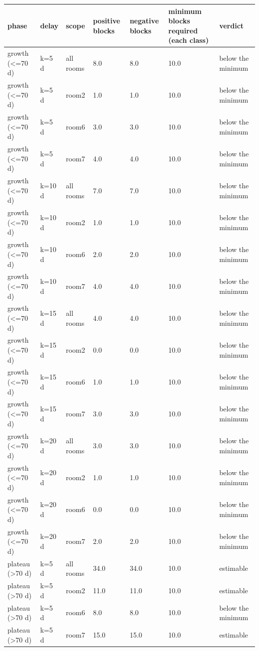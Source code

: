 \begin{tabular}{lllllll}
\hline
phase & delay & scope & positive blocks & negative blocks & minimum blocks required (each class) & verdict \\
\hline
growth (<=70 d) & k=5 d & all rooms & 8.0 & 8.0 & 10.0 & below the minimum \\
growth (<=70 d) & k=5 d & room2 & 1.0 & 1.0 & 10.0 & below the minimum \\
growth (<=70 d) & k=5 d & room6 & 3.0 & 3.0 & 10.0 & below the minimum \\
growth (<=70 d) & k=5 d & room7 & 4.0 & 4.0 & 10.0 & below the minimum \\
growth (<=70 d) & k=10 d & all rooms & 7.0 & 7.0 & 10.0 & below the minimum \\
growth (<=70 d) & k=10 d & room2 & 1.0 & 1.0 & 10.0 & below the minimum \\
growth (<=70 d) & k=10 d & room6 & 2.0 & 2.0 & 10.0 & below the minimum \\
growth (<=70 d) & k=10 d & room7 & 4.0 & 4.0 & 10.0 & below the minimum \\
growth (<=70 d) & k=15 d & all rooms & 4.0 & 4.0 & 10.0 & below the minimum \\
growth (<=70 d) & k=15 d & room2 & 0.0 & 0.0 & 10.0 & below the minimum \\
growth (<=70 d) & k=15 d & room6 & 1.0 & 1.0 & 10.0 & below the minimum \\
growth (<=70 d) & k=15 d & room7 & 3.0 & 3.0 & 10.0 & below the minimum \\
growth (<=70 d) & k=20 d & all rooms & 3.0 & 3.0 & 10.0 & below the minimum \\
growth (<=70 d) & k=20 d & room2 & 1.0 & 1.0 & 10.0 & below the minimum \\
growth (<=70 d) & k=20 d & room6 & 0.0 & 0.0 & 10.0 & below the minimum \\
growth (<=70 d) & k=20 d & room7 & 2.0 & 2.0 & 10.0 & below the minimum \\
plateau (>70 d) & k=5 d & all rooms & 34.0 & 34.0 & 10.0 & estimable \\
plateau (>70 d) & k=5 d & room2 & 11.0 & 11.0 & 10.0 & estimable \\
plateau (>70 d) & k=5 d & room6 & 8.0 & 8.0 & 10.0 & below the minimum \\
plateau (>70 d) & k=5 d & room7 & 15.0 & 15.0 & 10.0 & estimable \\

\end{tabular}
